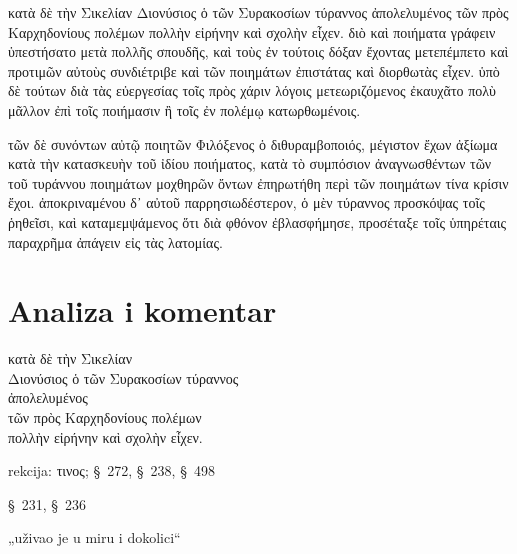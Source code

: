 {\large

\begin{greek}

\noindent κατὰ δὲ τὴν Σικελίαν Διονύσιος ὁ τῶν Συρακοσίων τύραννος ἀπολελυμένος τῶν πρὸς Καρχηδονίους πολέμων πολλὴν εἰρήνην καὶ σχολὴν εἶχεν. διὸ καὶ ποιήματα γράφειν ὑπεστήσατο μετὰ πολλῆς σπουδῆς, καὶ τοὺς ἐν τούτοις δόξαν ἔχοντας μετεπέμπετο καὶ προτιμῶν αὐτοὺς συνδιέτριβε καὶ τῶν ποιημάτων ἐπιστάτας καὶ διορθωτὰς εἶχεν. ὑπὸ δὲ τούτων διὰ τὰς εὐεργεσίας τοῖς πρὸς χάριν λόγοις μετεωριζόμενος ἐκαυχᾶτο πολὺ μᾶλλον ἐπὶ τοῖς ποιήμασιν ἢ τοῖς ἐν πολέμῳ κατωρθωμένοις.

τῶν δὲ συνόντων αὐτῷ ποιητῶν Φιλόξενος ὁ διθυραμβοποιός, μέγιστον ἔχων ἀξίωμα κατὰ τὴν κατασκευὴν τοῦ ἰδίου ποιήματος, κατὰ τὸ συμπόσιον ἀναγνωσθέντων τῶν τοῦ τυράννου ποιημάτων μοχθηρῶν ὄντων ἐπηρωτήθη περὶ τῶν ποιημάτων τίνα κρίσιν ἔχοι. ἀποκριναμένου δ᾽ αὐτοῦ παρρησιωδέστερον, ὁ μὲν τύραννος προσκόψας τοῖς ῥηθεῖσι, καὶ καταμεμψάμενος ὅτι διὰ φθόνον ἐβλασφήμησε, προσέταξε τοῖς ὑπηρέταις παραχρῆμα ἀπάγειν εἰς τὰς λατομίας.

\end{greek}

}


\section*{Analiza i komentar}



{\large
\begin{greek}
\noindent κατὰ δὲ τὴν Σικελίαν \\
Διονύσιος ὁ τῶν Συρακοσίων τύραννος \\
\tabto{2em} ἀπολελυμένος \\
\tabto{4em} τῶν πρὸς Καρχηδονίους πολέμων\\
πολλὴν εἰρήνην καὶ σχολὴν εἶχεν.\\

\end{greek}
}

\begin{description}[noitemsep]
\item[ἀπολελυμένος] rekcija: τινος; §~272, §~238, §~498
\item[εἶχεν] §~231, §~236
\item[εἰρήνην καὶ σχολὴν εἶχεν] „uživao je u miru i dokolici“

\end{description}


